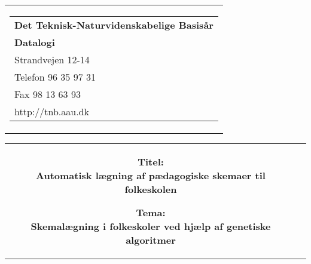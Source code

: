 \begin{titlepage}
	\begin{nopagebreak}
	{\small\samepage 
	\hfill\begin{tabular}{r}
	\parbox{6cm}{  
	\hfill \parbox{4.9cm}{\begin{tabular}{l}
	{\sf\small \textbf{Det Teknisk-Naturvidenskabelige Basis{\aa}r }}\\
	{\sf\small  \textbf{Datalogi}} \\
	{\sf\small Strandvejen 12-14} \\
	{\sf\small Telefon 96 35 97 31} \\
	{\sf\small Fax 98 13 63 93} \\
	{\sf\small http://tnb.aau.dk}
	\end{tabular}}}
	\\
	\end{tabular}

	\begin{tabular}{cc}
	\parbox{7cm}{
	\begin{description}

	\item {\bf Titel: \\Automatisk lægning af pædagogiske skemaer til folkeskolen} 
	  
	\item {\bf Tema: \\Skemalægning i folkeskoler ved hjælp af genetiske algoritmer} 

	\end{description}

	\parbox{7cm}{

}}
\end{tabular}}
\end{nopagebreak}
\end{titlepage}
